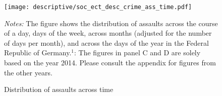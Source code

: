 \begin{figure}[ht]\centering
	\caption{Distribution of assaults across time}\label{fig_soc_ext:assault_time_distribution_2014}

	\texttt{[image: descriptive/soc\_ect\_desc\_crime\_ass\_time.pdf]}

	\begin{minipage}{\linewidth}
		\scriptsize{\emph{Notes:} The figure shows the distribution of assaults across the course of a day, days of the week, across months (adjusted for the number of days per month), and across the days of the year in the Federal Republic of Germany.\newline 	\hspace*{15 pt}$^1$: The figures in panel C and D are solely based on the year 2014. Please consult the appendix for figures from the other years.}
	\end{minipage}
\end{figure}


%

